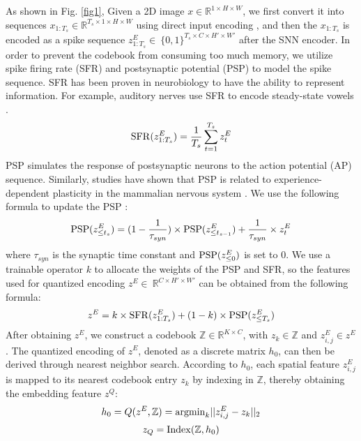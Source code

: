 \documentclass{article}
\begin{document}
As shown in Fig. \ref{fig1}, Given a 2D image $x\in\mathbb{R}^{1 \times H\times W}$, we first convert it into sequences $x_{1:T_s}\in\mathbb{R}^{T_s \times 1 \times H\times W}$ using direct input encoding \cite{coding}, and then the $x_{1:T_s}$ is encoded as a spike sequence $z_{1:T_s}^E\in\ \{0,1\}^{T_s \times C \times H'\times W'}$ after the SNN encoder. In order to prevent the codebook from consuming too much memory, we utilize spike firing rate (SFR) and postsynaptic potential (PSP) to model the spike sequence. SFR has been proven in neurobiology to have the ability to represent information. For example, auditory nerves use SFR to encode steady-state vowels \cite{b53}.
\begin{equation}
{\rm{SFR}}(z_{1:T_s}^E)=\frac{1}{T_s}\sum^{T_s}_{t=1}z^E_t
\end{equation}
PSP simulates the response of postsynaptic neurons to the action potential (AP) sequence. Similarly, studies have shown that PSP is related to experience-dependent plasticity in the mammalian nervous system \cite{b54}. We use the following formula to update the PSP \cite{b55}: 
\begin{equation}
{\rm{PSP}}(z_{\leq t_s}^E)=(1-\frac{1}{\tau_{syn}})\times{\rm{PSP}}(z_{\leq t_{s-1}}^E)+\frac{1}{\tau_{syn}}\times z_t^E
\end{equation}
where $\tau_{syn}$ is the synaptic time constant and ${\rm{PSP}}(z_{\leq 0}^E)$ is set to 0. We use a trainable operator $k$ to allocate the weights of the PSP and SFR, so the features used for quantized encoding $z^E\in\ \mathbb{R}^{C \times H'\times W'}$ can be obtained from the following formula:
\begin{equation}
z^E=k\times{\rm{SFR}}(z_{1:T_s}^E)+(1-k)\times{\rm{PSP}}(z_{\leq T_s}^E)
\end{equation}
After obtaining $z^E$, we construct a codebook $\mathbb Z \in \mathbb R^{K \times C}$, with $z_k \in \mathbb Z$ and  $z_{i,j}^E \in z^E$. The quantized encoding of $z^E$, denoted as a discrete matrix $h_0$, can then be derived through nearest neighbor search. According to $h_0$, each spatial feature $z_{i,j}^E$ is mapped to its nearest codebook entry $z_k$ by indexing in $\mathbb Z$, thereby obtaining the embedding feature $z^Q$:
\begin{equation}
h_0=Q(z^E,\mathbb Z)={\rm{arg min}}_k||z^E_{i,j}-z_k||_2
\end{equation}
\begin{equation}
z_Q = {\rm{Index}}(\mathbb Z,h_0)
\end{equation}
\end{document}

